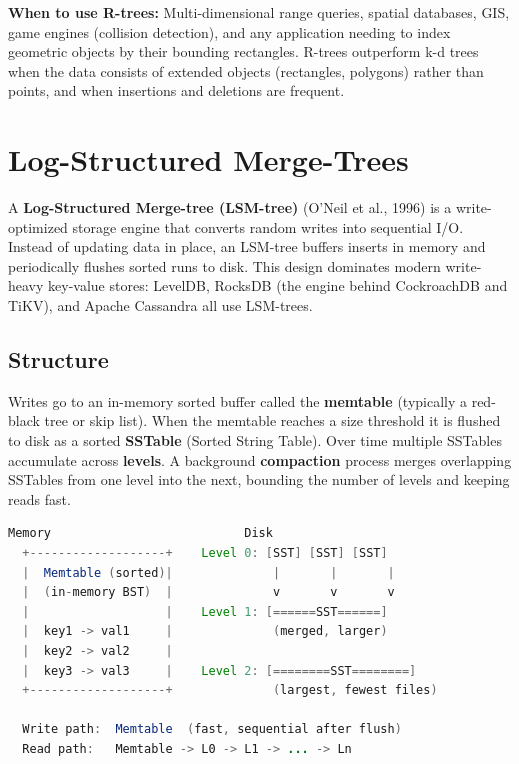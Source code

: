 \textbf{When to use R-trees:} Multi-dimensional range queries, spatial databases, GIS, game engines (collision detection), and any application needing to index geometric objects by their bounding rectangles. R-trees outperform k-d trees when the data consists of extended objects (rectangles, polygons) rather than points, and when insertions and deletions are frequent.

\section{Log-Structured Merge-Trees}

A \textbf{Log-Structured Merge-tree (LSM-tree)} (O'Neil et al., 1996) is a write-optimized storage engine that converts random writes into sequential I/O. Instead of updating data in place, an LSM-tree buffers inserts in memory and periodically flushes sorted runs to disk. This design dominates modern write-heavy key-value stores: LevelDB, RocksDB (the engine behind CockroachDB and TiKV), and Apache Cassandra all use LSM-trees.

\subsection{Structure}

Writes go to an in-memory sorted buffer called the \textbf{memtable} (typically a red-black tree or skip list). When the memtable reaches a size threshold it is flushed to disk as a sorted \textbf{SSTable} (Sorted String Table). Over time multiple SSTables accumulate across \textbf{levels}. A background \textbf{compaction} process merges overlapping SSTables from one level into the next, bounding the number of levels and keeping reads fast.

\begin{lstlisting}[language=Java]
  Memory                           Disk
  +-------------------+    Level 0: [SST] [SST] [SST]
  |  Memtable (sorted)|              |       |       |
  |  (in-memory BST)  |              v       v       v
  |                   |    Level 1: [======SST======]
  |  key1 -> val1     |              (merged, larger)
  |  key2 -> val2     |
  |  key3 -> val3     |    Level 2: [========SST========]
  +-------------------+              (largest, fewest files)

  Write path:  Memtable  (fast, sequential after flush)
  Read path:   Memtable -> L0 -> L1 -> ... -> Ln
\end{lstlisting}

